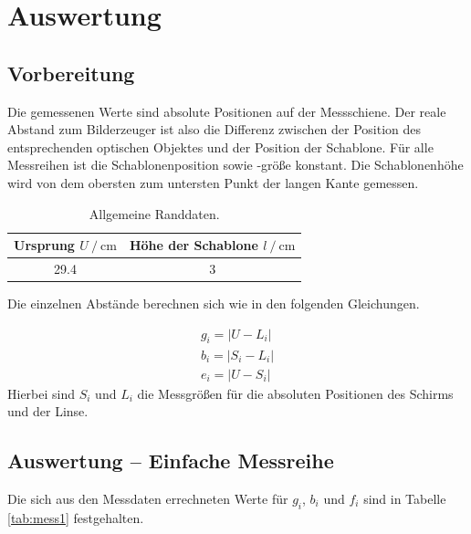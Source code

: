 \section{Auswertung}
\label{sec:Auswertung}

\subsection{Vorbereitung}
Die gemessenen Werte sind absolute Positionen auf der Messschiene. Der reale Abstand zum Bilderzeuger ist also die Differenz zwischen der Position des entsprechenden optischen Objektes
und der Position der Schablone. Für alle Messreihen ist die Schablonenposition sowie -größe konstant. Die Schablonenhöhe wird von dem obersten zum untersten Punkt der langen Kante gemessen.

\begin{table}
    \centering
    \caption{Allgemeine Randdaten.}
    \begin{tabular}{c c}
        \toprule
        {Ursprung $U \:/\: \si{\centi\meter}$} & Höhe der Schablone $l \:/\: \si{\centi\meter}$\\
        \midrule
        29.4 & 3 \\
    \end{tabular}
    \label{tab:rand}
\end{table}

Die einzelnen Abstände berechnen sich wie in den folgenden Gleichungen.

\begin{equation}
    \begin{gathered}
        g_i = |U - L_i| \\
        b_i = |S_i - L_i| \\
        e_i = |U - S_i|
    \end{gathered}
    \label{eqn:abstand}
\end{equation}
Hierbei sind $S_i$ und $L_i$ die Messgrößen für die absoluten Positionen des Schirms und der Linse.

\subsection{Auswertung -- Einfache Messreihe}
Die sich aus den Messdaten errechneten Werte für $g_i$, $b_i$ und $f_i$ sind in Tabelle \ref{tab:mess1} festgehalten.

